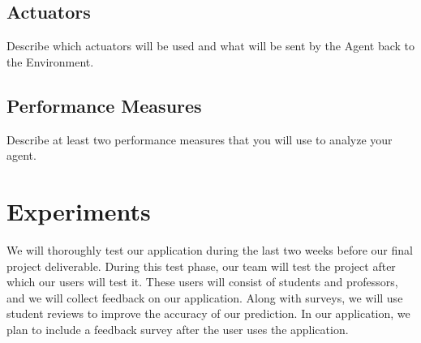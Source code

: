 \documentclass{article}
\begin{document}
\subsection{Actuators}
Describe which actuators will be used and what will be sent by the Agent back to the Environment.
\subsection{Performance Measures}
Describe at least two performance measures that you will use to analyze your agent.

\section{Experiments}
We will thoroughly test our application during the last two weeks before our final project deliverable. During this test phase, our team will test the project after which our users will test it. These users will consist of students and professors, and we will collect feedback on our application. Along with surveys, we will use student reviews to improve the accuracy of our prediction. In our application, we plan to include a feedback survey after the user uses the application. 

 

\end{document}
